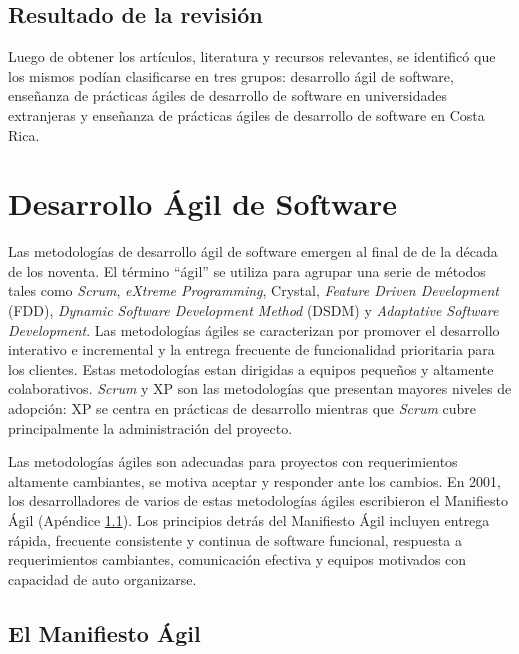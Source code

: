 \subsection{Resultado de la revisión} \label{sec:resultado-rev-lit}
Luego de obtener los artículos, literatura y recursos relevantes, se identificó que los mismos podían clasificarse en tres grupos: desarrollo ágil de software, enseñanza de prácticas ágiles de desarrollo de software en universidades extranjeras y enseñanza de prácticas ágiles de desarrollo de software en Costa Rica.



\section{Desarrollo Ágil de Software} \label{sec:desarrollo-agil}
Las metodologías de desarrollo ágil de software emergen al final de de la década de los noventa. El término ``ágil'' se utiliza para agrupar una serie de métodos tales como \emph{Scrum}, \emph{eXtreme Programming}, Crystal, \emph{Feature Driven Development} (FDD), \emph{Dynamic Software Development Method} (DSDM) y \emph{Adaptative Software Development}\cite{rashina-et-al}. Las metodologías ágiles se caracterizan por promover el desarrollo interativo e incremental y la entrega frecuente de funcionalidad prioritaria para los clientes. Estas metodologías estan dirigidas a equipos pequeños y altamente colaborativos. \emph{Scrum} y XP son las metodologías que presentan mayores niveles de adopción\cite{version-one}: XP se centra en prácticas de desarrollo mientras que \emph{Scrum} cubre principalmente la administración del proyecto.

Las metodologías ágiles son adecuadas para proyectos con requerimientos altamente cambiantes, se motiva aceptar y responder ante los cambios. En 2001, los desarrolladores de varios de estas metodologías ágiles escribieron el Manifiesto Ágil \cite{agile-manifesto} (Apéndice \ref{apendice:a}). Los principios detrás del Manifiesto Ágil incluyen entrega rápida, frecuente consistente y continua de software funcional, respuesta a requerimientos cambiantes, comunicación efectiva y equipos motivados con capacidad de auto organizarse.

\subsection{El Manifiesto Ágil}\label{apendice:a}

